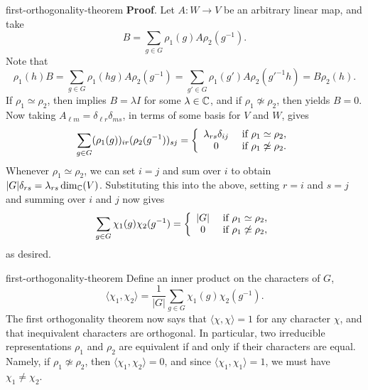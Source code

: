 \begin{example}{first-orthogonality-theorem}
    \textbf{Proof}. Let $A : W \to V$ be an arbitrary linear map, and take
    \[ B = \sum_{g \in G} \rho_1(g) A \rho_2(g^{-1}) . \]
    Note that
    \[ \rho_1(h) B = \sum_{g \in G} \rho_1(hg) A \rho_2(g^{-1}) = \sum_{g' \in G} \rho_1(g') A \rho_2(g'^{-1} h) = B \rho_2(h) . \]
    If $\rho_1 \simeq \rho_2$, then  implies $B = \lambda I$ for some $\lambda \in \mathbb{C}$, and if $\rho_1 \not\simeq \rho_2$, then  yields $B = 0$. Now taking $A_{\ell m} = \delta_{\ell r} \delta_{ms}$, in terms of some basis for $V$ and $W$, gives
    \[ \sum_{g \in G} (\rho_1(g))_{ir} (\rho_2(g^{-1}))_{sj} = \left\{ \begin{array}{cl} \lambda_{rs} \delta_{ij} & \textup{ if } \rho_1 \simeq \rho_2 , \\ 0 & \textup{ if } \rho_1 \not\simeq \rho_2 . \end{array} \right. \]
    Whenever $\rho_1 \simeq \rho_2$, we can set $i = j$ and sum over $i$ to obtain $|G| \delta_{rs} = \lambda_{rs} \dim_{\mathbb{C}}(V)$. Substituting this into the above, setting $r = i$ and $s = j$ and summing over $i$ and $j$ now gives
    \[ \sum_{g \in G} \chi_1(g) \chi_2(g^{-1}) = \left\{ \begin{array}{cl} |G| & \textup{ if } \rho_1 \simeq \rho_2 , \\ 0 & \textup{ if } \rho_1 \not\simeq \rho_2 , \end{array} \right. \]
    as desired.
\end{example}

\begin{example}{first-orthogonality-theorem}
    Define an inner product on the characters of $G$,
    \[ \langle \chi_1, \chi_2 \rangle = \frac{1}{|G|} \sum_{g \in G} \chi_1(g) \chi_2(g^{-1}) . \]
    The first orthogonality theorem now says that $\langle \chi, \chi \rangle = 1$ for any character $\chi$, and that inequivalent characters are orthogonal. In particular, two irreducible representations $\rho_1$ and $\rho_2$ are equivalent if and only if their characters are equal. Namely, if $\rho_1 \not\simeq \rho_2$, then $\langle \chi_1, \chi_2 \rangle = 0$, and since $\langle \chi_1, \chi_1 \rangle = 1$, we must have $\chi_1 \ne \chi_2$.
\end{example}

